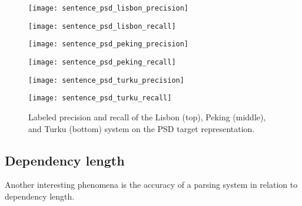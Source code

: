 \begin{figure}[h]
    \centering
    \begin{minipage}{0.50\textwidth}
        \centering
        \texttt{[image: sentence\_psd\_lisbon\_precision]}
    \end{minipage}\hfill
    \begin{minipage}{0.50\textwidth}
        \centering
        \texttt{[image: sentence\_psd\_lisbon\_recall]}
    \end{minipage}
    
    \begin{minipage}{0.50\textwidth}
        \centering
        \texttt{[image: sentence\_psd\_peking\_precision]}
    \end{minipage}\hfill
    \begin{minipage}{0.50\textwidth}
        \centering
        \texttt{[image: sentence\_psd\_peking\_recall]}
    \end{minipage}
    
    \begin{minipage}{0.50\textwidth}
        \centering
        \texttt{[image: sentence\_psd\_turku\_precision]}
    \end{minipage}\hfill
    \begin{minipage}{0.50\textwidth}
        \centering
        \texttt{[image: sentence\_psd\_turku\_recall]}
    \end{minipage}
    
    \caption{Labeled precision and recall of the Lisbon (top), Peking (middle), and Turku (bottom) system on the PSD target representation.}
    \label{fig:psd_s_length}
\end{figure}


\subsection{Dependency length}

Another interesting phenomena is the accuracy of a parsing system in relation to dependency length. 




